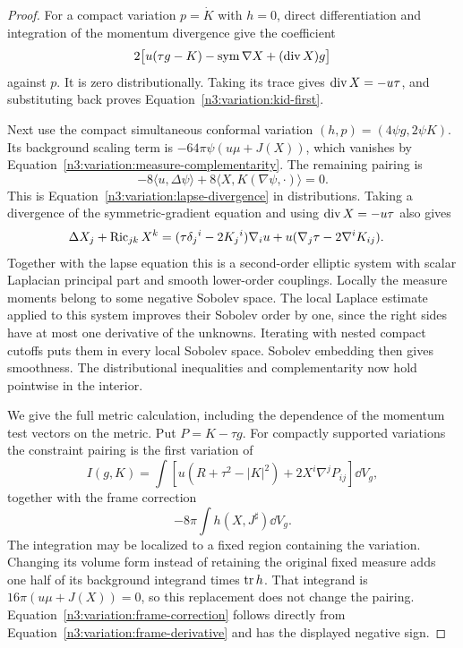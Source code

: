 \begin{proof}
For a compact variation $p=\dot K$ with $h=0$, direct differentiation
and integration of the momentum divergence give the coefficient
\[
 2\bigl[u(\tau g-K)-\operatorname{sym}\nabla X+(\operatorname{div} X)g\bigr]
\]
against $p$.  It is zero distributionally.  Taking its trace gives
$\operatorname{div} X=-u\tau$, and substituting back proves
Equation~\eqref{n3:variation:kid-first}.

Next use the compact simultaneous conformal variation
$(h,p)=(4\psi g,2\psi K)$.  Its background scaling term is
$-64\pi\psi(u\mu+J(X))$, which vanishes by
Equation~\eqref{n3:variation:measure-complementarity}.  The remaining
pairing is
\[
 -8\langle u,\Delta\psi\rangle
     +8\langle X,K(\nabla\psi,\cdot)\rangle=0.
\]
This is Equation~\eqref{n3:variation:lapse-divergence} in distributions.
Taking a divergence of the symmetric-gradient equation and using
$\operatorname{div} X=-u\tau$ also gives
\begin{equation}
 \begin{split}
  \Delta X_j+\operatorname{Ric}_{jk}X^k
    &=(\tau\delta_j{}^i-2K_j{}^i)\nabla_i u
           +u(\nabla_j\tau-2\nabla^iK_{ij}).
 \end{split}
 \label{n3:variation:elliptic-shift}
\end{equation}
Together with the lapse equation this is a second-order elliptic
system with scalar Laplacian principal part and smooth lower-order
couplings.  Locally the measure moments belong to some negative
Sobolev space.  The local Laplace estimate applied to this system
improves their Sobolev order by one, since the right sides have at
most one derivative of the unknowns.  Iterating with nested compact
cutoffs puts them in every local Sobolev space.  Sobolev embedding
then gives smoothness.  The distributional inequalities and
complementarity now hold pointwise in the interior.

We give the full metric calculation, including the dependence of
the momentum test vectors on the metric.  Put $P=K-\tau g$.
For compactly supported variations the constraint pairing is the
first variation of
\begin{equation}
 I(g,K)=\int
  \left[u(R+\tau^2-|K|^2)+2X^i\nabla^jP_{ij}\right]\dd V_g,
 \label{n3:variation:constraint-action}
\end{equation}
together with the frame correction
\begin{equation}
 -8\pi\int h(X,J^\sharp)\dd V_g.
 \label{n3:variation:frame-correction}
\end{equation}
The integration may be localized to a fixed region containing the
variation.  Changing its volume form instead of retaining the
original fixed measure adds one half of its background integrand
times $\operatorname{tr} h$.  That integrand is $16\pi(u\mu+J(X))=0$,
so this replacement does not change the pairing.
Equation~\eqref{n3:variation:frame-correction} follows directly from
Equation~\eqref{n3:variation:frame-derivative} and has the displayed
negative sign.


\end{proof}
